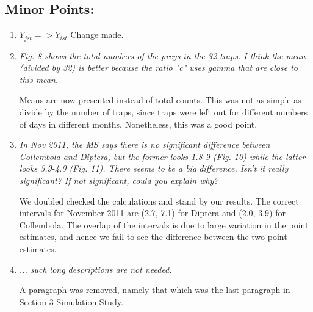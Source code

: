 \documentclass[12pt]{article}
\begin{document}
\subsection{Minor Points:}

\begin{enumerate}
\item  \textit{$Y_{jst} => Y_{ist}$}
  Change made.

\item  \textit{Fig. 8 shows the total numbers of the preys in the 32 traps. I think the mean (divided by 32) is better because the ratio "c" uses gamma that are close to this mean.} 
  
  Means are now presented instead of total counts.  This was not as simple as divide by the number of traps, since traps were left out for different numbers of days in different months.  Nonetheless, this was a good point.

\item  \textit{In Nov 2011, the MS says there is no significant difference between Collembola and Diptera, but the former looks 1.8-9 (Fig. 10) while the latter looks 3.9-4.0 (Fig. 11). There seems to be a big difference. Isn't it really significant? If not significant, could you explain why?}

  We doubled checked the calculations and stand by our results.  The correct intervals for November 2011 are (2.7, 7.1) for Diptera and (2.0, 3.9) for Collembola.  The overlap of the intervals is due to large variation in the point estimates, and hence we fail to see the difference between the two point estimates.

\item  \textit{... such long descriptions are not needed.}

A paragraph was removed, namely that which was the last paragraph in Section 3 Simulation Study.
\end{enumerate}
\end{document}

